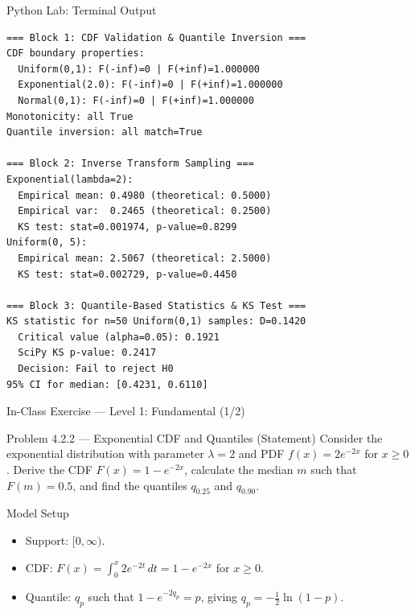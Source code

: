 \documentclass[aspectratio=169,xcolor={dvipsnames,table}]{beamer}
\begin{document}
\begin{frame}[fragile]{Python Lab: Terminal Output}
	\vspace{-0.1cm}
	\begin{block}{}
		\fontsize{4pt}{5pt}\selectfont
		\begin{verbatim}
=== Block 1: CDF Validation & Quantile Inversion ===
CDF boundary properties:
  Uniform(0,1): F(-inf)=0 | F(+inf)=1.000000
  Exponential(2.0): F(-inf)=0 | F(+inf)=1.000000
  Normal(0,1): F(-inf)=0 | F(+inf)=1.000000
Monotonicity: all True
Quantile inversion: all match=True

=== Block 2: Inverse Transform Sampling ===
Exponential(lambda=2):
  Empirical mean: 0.4980 (theoretical: 0.5000)
  Empirical var:  0.2465 (theoretical: 0.2500)
  KS test: stat=0.001974, p-value=0.8299
Uniform(0, 5):
  Empirical mean: 2.5067 (theoretical: 2.5000)
  KS test: stat=0.002729, p-value=0.4450

=== Block 3: Quantile-Based Statistics & KS Test ===
KS statistic for n=50 Uniform(0,1) samples: D=0.1420
  Critical value (alpha=0.05): 0.1921
  SciPy KS p-value: 0.2417
  Decision: Fail to reject H0
95% CI for median: [0.4231, 0.6110]
		\end{verbatim}
	\end{block}
\end{frame}

\begin{frame}{In-Class Exercise --- Level 1: Fundamental (1/2)}
	\vspace{-0.1cm}
	\begin{block}{Problem 4.2.2 --- Exponential CDF and Quantiles (Statement)}
		Consider the exponential distribution with parameter $\lambda = 2$ and PDF $f(x) = 2e^{-2x}$ for $x \ge 0$. Derive the CDF $F(x) = 1 - e^{-2x}$, calculate the median $m$ such that $F(m) = 0.5$, and find the quantiles $q_{0.25}$ and $q_{0.90}$.
	\end{block}
	\vspace{0.15cm}
	\pause
	\begin{alertblock}{Model Setup}
		\begin{itemize}\itemsep=0.04cm
			\item Support: $[0, \infty)$.
			\item CDF: $F(x) = \int_{0}^{x} 2e^{-2t}\,dt = 1 - e^{-2x}$ for $x \ge 0$.
			\item Quantile: $q_{p}$ such that $1 - e^{-2q_{p}} = p$, giving $q_{p} = -\frac{1}{2}\ln(1-p)$.
		\end{itemize}
	\end{alertblock}
\end{frame}
\end{document}
